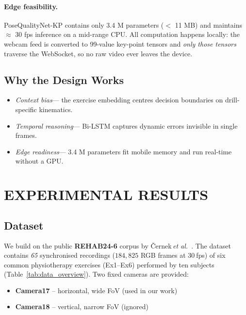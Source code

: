 \documentclass{article}
\begin{document}
\paragraph{Edge feasibility.}
PoseQualityNet-KP contains only 3.4 M parameters ($<$ 11 MB) and maintains
$\approx$ 30 fps inference on a mid-range CPU.  All computation happens
locally: the webcam feed is converted to 99-value key-point tensors and
\emph{only those tensors} traverse the WebSocket, so no raw video ever
leaves the device.

\subsection{Why the Design Works}
\begin{itemize}[leftmargin=1.35em]
  \item \emph{Context bias}\;— the exercise embedding centres decision
        boundaries on drill-specific kinematics.
  \item \emph{Temporal reasoning}\;— Bi-LSTM captures dynamic errors
        invisible in single frames.
  \item \emph{Edge readiness}\;— 3.4 M parameters fit mobile memory and
        run real-time without a GPU.
\end{itemize}

\section{EXPERIMENTAL RESULTS}

\subsection{Dataset}
\label{sec:data}

We build on the public \textbf{REHAB24-6} corpus by
Černek\,\textit{et al.}~\cite{cernek2024rehab24}.  
The dataset contains \emph{65} synchronised recordings  
($184{,}825$ RGB frames at 30 fps) of six common physiotherapy
exercises (Ex1–Ex6) performed by ten subjects
(Table~\ref{tab:data_overview}).  
Two fixed cameras are provided:

\begin{itemize}
  \item \textbf{Camera17} – horizontal, wide FoV (used in our work)
  \item \textbf{Camera18} – vertical, narrow FoV (ignored)
\end{itemize}
\end{document}
